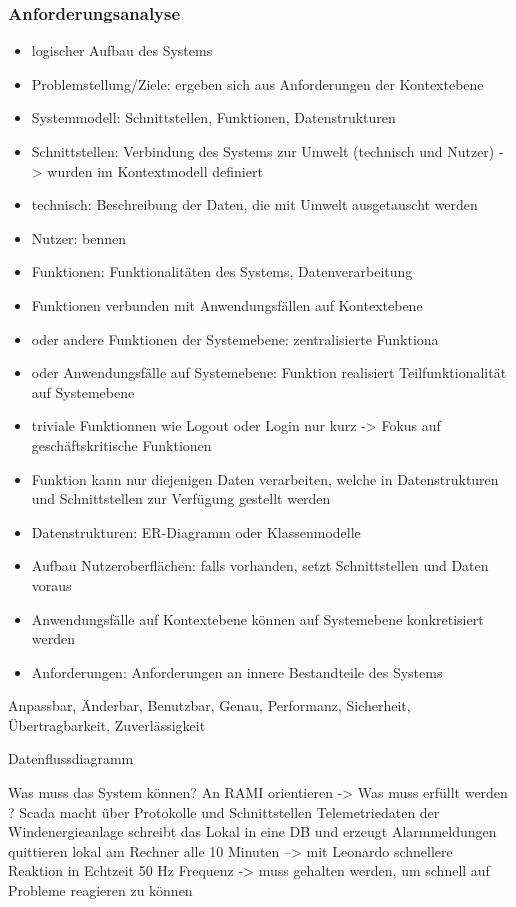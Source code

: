 \subsubsection{Anforderungsanalyse}
\begin{itemize}
  \item logischer Aufbau des Systems
  \item Problemstellung/Ziele: ergeben sich aus Anforderungen der Kontextebene
  \item Systemmodell: Schnittstellen, Funktionen, Datenstrukturen
  \item Schnittstellen: Verbindung des Systems zur Umwelt (technisch und Nutzer) -> wurden im Kontextmodell definiert
  \item technisch: Beschreibung der Daten, die mit Umwelt ausgetauscht werden
  \item Nutzer: bennen
  \item Funktionen: Funktionalitäten des Systems, Datenverarbeitung
  \item Funktionen verbunden mit Anwendungsfällen auf Kontextebene
  \item oder andere Funktionen der Systemebene: zentralisierte Funktiona
  \item oder Anwendungsfälle auf Systemebene: Funktion realisiert Teilfunktionalität auf Systemebene
  \item triviale Funktionnen wie Logout oder Login nur kurz -> Fokus auf geschäftskritische Funktionen
  \item Funktion kann nur diejenigen Daten verarbeiten, welche in Datenstrukturen und Schnittstellen zur Verfügung gestellt werden
  \item Datenstrukturen: ER-Diagramm oder Klassenmodelle
  \item Aufbau Nutzeroberflächen: falls vorhanden, setzt Schnittstellen und Daten voraus
  \item Anwendungsfälle auf Kontextebene können auf Systemebene konkretisiert werden
  \item Anforderungen: Anforderungen an innere Bestandteile des Systems
\end{itemize}
Anpassbar, Änderbar, Benutzbar, Genau, Performanz, Sicherheit, Übertragbarkeit, Zuverlässigkeit

Datenflussdiagramm

Was muss das System können? An RAMI orientieren -> Was muss erfüllt werden ?
Scada macht über Protokolle und Schnittstellen Telemetriedaten der Windenergieanlage
schreibt das Lokal in eine DB und erzeugt Alarmmeldungen
quittieren lokal am Rechner
alle 10 Minuten --> mit Leonardo schnellere Reaktion in Echtzeit
50 Hz Frequenz -> muss gehalten werden, um schnell auf Probleme reagieren zu können


